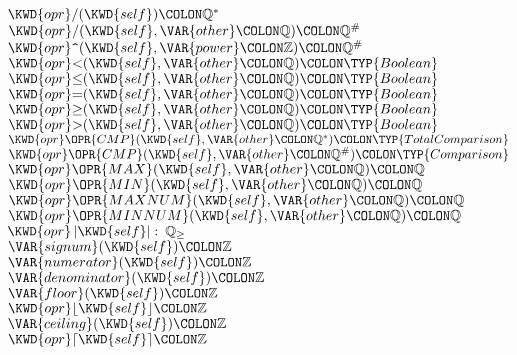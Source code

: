 \begin{Fortress}
\(  \KWD{opr} /(\KWD{self})\COLON \mathbb{Q}^*\)\\
\(  \KWD{opr} /(\KWD{self}, \VAR{other}\COLON \mathbb{Q})\COLON \mathbb{Q}^{\#}\)\\
\(  \KWD{opr} \mathord{\hbox{\tt\char'136}}(\KWD{self}, \VAR{power}\COLON \mathbb{Z})\COLON \mathbb{Q}^{\#}\)\\
\(  \KWD{opr} \mathord{<}(\KWD{self}, \VAR{other}\COLON \mathbb{Q})\COLON \TYP{Boolean}\)\\
\(  \KWD{opr} \mathord{\leq}(\KWD{self}, \VAR{other}\COLON \mathbb{Q})\COLON \TYP{Boolean}\)\\
\(  \KWD{opr} \mathord{=}(\KWD{self}, \VAR{other}\COLON \mathbb{Q})\COLON \TYP{Boolean}\)\\
\(  \KWD{opr} \mathord{\geq}(\KWD{self}, \VAR{other}\COLON \mathbb{Q})\COLON \TYP{Boolean}\)\\
\(  \KWD{opr} \mathord{>}(\KWD{self}, \VAR{other}\COLON \mathbb{Q})\COLON \TYP{Boolean}\)\\
\(  \KWD{opr} \mathord{\OPR{CMP}}(\KWD{self}, \VAR{other}\COLON \mathbb{Q}^*)\COLON \TYP{TotalComparison}\)\\
\(  \KWD{opr} \mathord{\OPR{CMP}}(\KWD{self}, \VAR{other}\COLON \mathbb{Q}^{\#})\COLON \TYP{Comparison}\)\\
\(  \KWD{opr} \mathord{\OPR{MAX}}(\KWD{self}, \VAR{other}\COLON \mathbb{Q})\COLON \mathbb{Q}\)\\
\(  \KWD{opr} \mathord{\OPR{MIN}}(\KWD{self}, \VAR{other}\COLON \mathbb{Q})\COLON \mathbb{Q}\)\\
\(  \KWD{opr} \mathord{\OPR{MAXNUM}}(\KWD{self}, \VAR{other}\COLON \mathbb{Q})\COLON \mathbb{Q}\)\\
\(  \KWD{opr} \mathord{\OPR{MINNUM}}(\KWD{self}, \VAR{other}\COLON \mathbb{Q})\COLON \mathbb{Q}\)\\
\(  \KWD{opr} \left|\mathord{\KWD{self}}\right| \mathrel{\mathtt{:}}\:\mathbb{Q}_{\geq}\)\\
\(  \VAR{signum}(\KWD{self})\COLON \mathbb{Z}\)\\
\(  \VAR{numerator}(\KWD{self})\COLON \mathbb{Z}\)\\
\(  \VAR{denominator}(\KWD{self})\COLON \mathbb{Z}\)\\
\(  \VAR{floor}(\KWD{self})\COLON \mathbb{Z}\)\\
\(  \KWD{opr} \lfloor \mathord{\KWD{self}} \rfloor\COLON \mathbb{Z}\)\\
\(  \VAR{ceiling}(\KWD{self})\COLON \mathbb{Z}\)\\
\(  \KWD{opr} \lceil \mathord{\KWD{self}} \rceil\COLON \mathbb{Z}\)\\

\end{Fortress}
